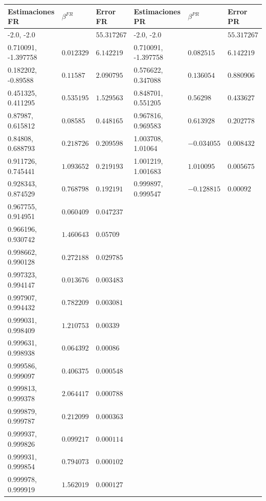 \begin{example}
\begin{table}
\small
\begin{tabular}{llllll}
	Estimaciones FR & $\beta^{FR}$ & Error FR & Estimaciones PR & $\beta^{PR}$ & Error PR \\ \hline
	-2.0, -2.0 &  & $55.317267$ & -2.0, -2.0 &  & $55.317267$ \\
	0.710091, -1.397758 & $0.012329$ & $6.142219$ & 0.710091, -1.397758 & $0.082515$ & $6.142219$ \\
	0.182202, -0.89588 & $0.11587$ & $2.090795$ & 0.576622, 0.347088 & $0.136054$ & $0.880906$ \\
	0.451325, 0.411295 & $0.535195$ & $1.529563$ & 0.848701, 0.551205 & $0.56298$ & $0.433627$ \\
	0.87987, 0.615812 & $0.08585$ & $0.448165$ & 0.967816, 0.969583 & $0.613928$ & $0.202778$ \\
	0.84808, 0.688793 & $0.218726$ & $0.209598$ & 1.003708, 1.01064 & $-0.034055$ & $0.008432$ \\
	0.911726, 0.745441 & $1.093652$ & $0.219193$ & 1.001219, 1.001683 & $1.010095$ & $0.005675$ \\
	0.928343, 0.874529 & $0.768798$ & $0.192191$ & 0.999897, 0.999547 & $-0.128815$ & $0.00092$ \\
	0.967755, 0.914951 & $0.060409$ & $0.047237$ &  &  &  \\
	0.966196, 0.930742 & $1.460643$ & $0.05709$ &  &  &  \\
	0.998662, 0.990128 & $0.272188$ & $0.029785$ &  &  &  \\
	0.997323, 0.994147 & $0.013676$ & $0.003483$ &  &  &  \\
	0.997907, 0.994432 & $0.782209$ & $0.003081$ &  &  &  \\
	0.999031, 0.998409 & $1.210753$ & $0.00339$ &  &  &  \\
	0.999631, 0.998938 & $0.064392$ & $0.00086$ &  &  &  \\
	0.999586, 0.999097 & $0.406375$ & $0.000548$ &  &  &  \\
	0.999813, 0.999378 & $2.064417$ & $0.000788$ &  &  &  \\
	0.999879, 0.999787 & $0.212099$ & $0.000363$ &  &  &  \\
	0.999937, 0.999826 & $0.099217$ & $0.000114$ &  &  &  \\
	0.999931, 0.999854 & $0.794073$ & $0.000102$ &  &  &  \\
	0.999978, 0.999919 & $1.562019$ & $0.000127$ &  &  &  \\
\end{tabular}
\end{table}
\end{example}


